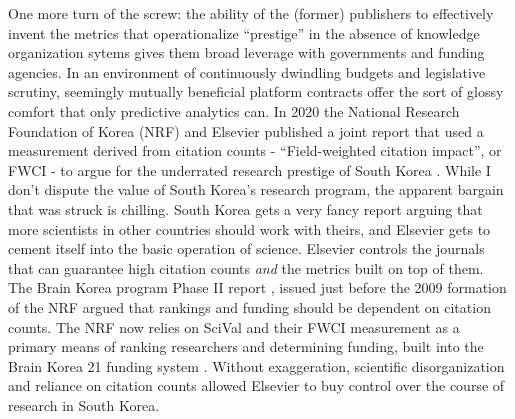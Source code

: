 One more turn of the screw: the ability of the (former) publishers to
effectively invent the metrics that operationalize ``prestige'' in the
absence of knowledge organization sytems gives them broad leverage with
governments and funding agencies. In an environment of continuously
dwindling budgets and legislative scrutiny, seemingly mutually
beneficial platform contracts offer the sort of glossy comfort that only
predictive analytics can. In 2020 the National Research Foundation of
Korea (NRF) and Elsevier published a joint report that used a
measurement derived from citation counts - ``Field-weighted citation
impact'', or FWCI - to argue for the underrated research prestige of
South Korea \citep{researchfoundationofkoreaSouthKoreaTechnological2020} . While I don't
dispute the value of South Korea's research program, the apparent
bargain that was struck is chilling. South Korea gets a very fancy
report arguing that more scientists in other countries should work with
theirs, and Elsevier gets to cement itself into the basic operation of
science. Elsevier controls the journals that can guarantee high citation
counts \emph{and} the metrics built on top of them. The Brain Korea
program Phase II report  \citep{seongBrainKorea212008} , issued just before the 2009 formation of the
NRF argued that rankings and funding should be dependent on citation
counts. The NRF now relies on SciVal and their FWCI measurement as a
primary means of ranking researchers and determining funding, built into
the Brain Korea 21 funding system \citep{elsevierCaseStudyNational2019, elsevierkoreaSciValHwalyongeulWihan2021} . Without exaggeration, scientific disorganization and reliance on
citation counts allowed Elsevier to buy control over the course of
research in South Korea.

